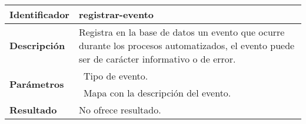 	\vspace{5mm}\\
	\begin{tabular}{|p{}|p{}|}
		\hline
		\textbf{Identificador}	& \textbf{registrar-evento}\\
		\hline
		\hline
		\textbf{Descripción}	& Registra en la base de datos un evento que ocurre durante los procesos automatizados, el evento puede ser de carácter informativo o de error.\\
		\hline
		\multirow{2}{*}{\textbf{Parámetros}}	& \textbullet\, Tipo de evento.\\
												& \textbullet\, Mapa con la descripción del evento.\\
		\hline
		\textbf{Resultado}		& No ofrece resultado.\\
		\hline
	\end{tabular}
	\vspace{5mm}

